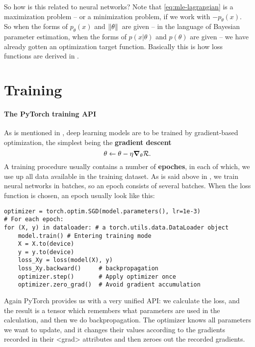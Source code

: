 \documentclass[hyperref, a4paper, 12pt]{report}
\newcommand*{\concept}[1]{{\textbf{#1}}}
\def\texttt#1{<#1>}%
\newcommand{\shortcode}[1]{\texttt{#1}}
\begin{document}
So how is this related to neural networks?
Note that \eqref{eq:mle-lagrangian} is a maximization problem -- or a minimization problem,
if we work with $- p_\theta(x)$.
So when the forms of $p_\theta(x)$ and $\norm*{\theta}$ are given 
-- in the language of Bayesian parameter estimation, when the forms of $p(x | \theta)$ and $p(\theta)$ are given --
we have already gotten an optimization target function.
Basically this is how loss functions are derived in .

\section{Training}

\paragraph*{The PyTorch training API}
As is mentioned in , deep learning models are to be trained by gradient-based optimization,
the simplest being the \concept{gradient descent}
\begin{equation}
    \theta \leftarrow \theta - \eta \grad_\theta \mathcal{R}.
    \label{eq:sgd-example}
\end{equation}
A training procedure usually contains a number of \concept{epoches},
in each of which, we use up all data available in the training dataset.
As is said above in , 
we train neural networks in batches, so an epoch consists of several batches.
When the loss function is chosen, 
an epoch usually look like this:

\begin{lstlisting}
optimizer = torch.optim.SGD(model.parameters(), lr=1e-3)
# For each epoch:
for (X, y) in dataloader: # a torch.utils.data.DataLoader object
    model.train() # Entering training mode 
    X = X.to(device)
    y = y.to(device)
    loss_Xy = loss(model(X), y)
    loss_Xy.backward()     # backpropagation
    optimizer.step()       # Apply optimizer once 
    optimizer.zero_grad()  # Avoid gradient accumulation
\end{lstlisting}

Again PyTorch provides us with a very unified API:
we calculate the loss, and the result is a tensor which remembers what parameters are used in the calculation,
and then we do backpropagation.
The optimizer knows all parameters we want to update,
and it changes their values according to the gradients recorded in their \shortcode{grad} attributes
and then zeroes out the recorded gradients.
\end{document}
